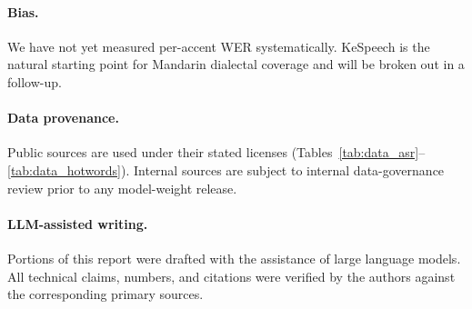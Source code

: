 \paragraph{Bias.}
We have not yet measured per-accent WER systematically. KeSpeech is the
natural starting point for Mandarin dialectal coverage and will be
broken out in a follow-up.

\paragraph{Data provenance.}
Public sources are used under their stated licenses (Tables~\ref{tab:data_asr}--\ref{tab:data_hotwords}).
Internal sources are subject to internal data-governance review prior
to any model-weight release.

\paragraph{LLM-assisted writing.}
Portions of this report were drafted with the assistance of large
language models. All technical claims, numbers, and citations were
verified by the authors against the corresponding primary sources.
